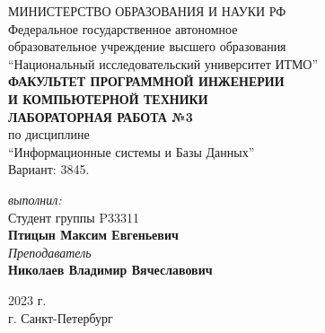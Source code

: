 
\begin{center}
	МИНИСТЕРСТВО ОБРАЗОВАНИЯ И НАУКИ РФ\\
	\hfill \break
	Федеральное государственное автономное\\
	образовательное учреждение высшего образования\\
	``Национальный исследовательский университет ИТМО''\\
	\hfill \break
	\textbf{ФАКУЛЬТЕТ ПРОГРАММНОЙ ИНЖЕНЕРИИ \\
	И КОМПЬЮТЕРНОЙ ТЕХНИКИ}\\
	\vspace{2cm}
	\large{\textbf{ЛАБОРАТОРНАЯ РАБОТА №3}}\\
	\hfill \break
	по дисциплине\\
		\large{``Информационные системы и Базы Данных''}\\
	\hfill \break
	Вариант: 3845. \\
\end{center}
\begin{flushright}
	\vspace{3cm}
	\textit{выполнил:}\\
	Студент группы P33311\\
	\textbf{Птицын Максим Евгеньевич}\\
	\textit{Преподаватель}\\
	\textbf{Николаев Владимир Вячеславович}
\end{flushright}
\vspace{5cm}
\begin{center}
	2023 г.\\
	г. Санкт-Петербург
\end{center}
\thispagestyle{empty}
\newpage